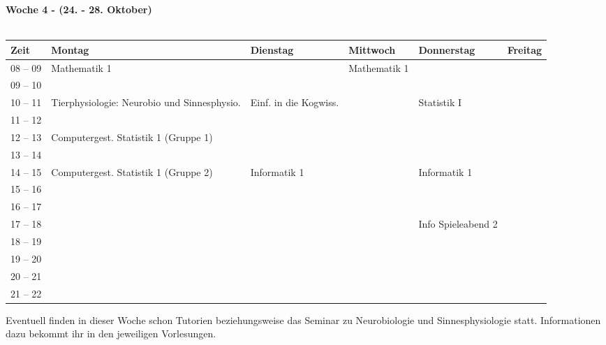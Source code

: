 \vfil
\textbf{Woche 4 - (24. - 28. Oktober)}\\
\\
\begin{tabular}{|l|p{}|p{}|p{}|p{}|p{}|} \hline
	Zeit & Montag & Dienstag & Mittwoch & Donnerstag & Freitag \\ 
	\hline \hline
 08 -- 09 & \footnotesize{Mathematik 1} & & \footnotesize{Mathematik 1} & & \\ \cline{1-1}
 09 -- 10 & & & & & \\ \cline{1-5}
 10 -- 11 & \footnotesize{Tierphysiologie: Neurobio und Sinnesphysio.} & \footnotesize{Einf. in die Kogwiss.} & & \footnotesize{Statistik I} & \\ \cline{1-1} 
 11 -- 12 &  &  & &  & \\ \hline
 12 -- 13 & \footnotesize{Computergest. Statistik 1 (Gruppe 1)}& & & & \\ \cline{1-1}
 13 -- 14 & & & & & \\ \hline
 14 -- 15 & \footnotesize{Computergest. Statistik 1 (Gruppe 2)} & \footnotesize{Informatik 1} & & \footnotesize{Informatik 1} & \\  \cline {1-1}
 15 -- 16 & &  & & & \\ \hline
 16 -- 17 & &  & & & \\ \cline{1-1}
 17 -- 18 & & & & \scriptsize{Info Spieleabend 2} \cellcolor{lightlightgray}& \\ \cline{1-1} \cline{4-4} \cline{6-6}
 18 -- 19 & & & & \cellcolor{lightlightgray}& \\ \cline{1-1}
 19 -- 20 & & & & \cellcolor{lightlightgray} & \\ \cline{1-1} \cline{6-6}
 20 -- 21 & & & &  \cellcolor{lightlightgray}& \\ \cline{1-1}
 21 -- 22 & & & &  \cellcolor{lightlightgray}& \\ \hline
\end{tabular}


\footnotesize{Eventuell finden in dieser Woche schon Tutorien beziehungsweise das Seminar zu Neurobiologie und Sinnesphysiologie statt. Informationen dazu bekommt ihr in den jeweiligen Vorlesungen.}
\normalsize
\newpage
